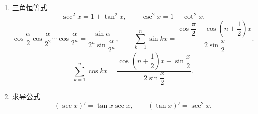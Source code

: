\begin{theorem}
\begin{enumerate}[label=\arabic*.]
\[                  \qquad
                  \cos\alpha=\dfrac{1-\tan^2\dfrac{\alpha}{2}}{1+\tan^2\dfrac{\alpha}{2}}.
              \]
        \item 三角恒等式
              \[
                  \sec^2x=1+\tan^2x,
                  \qquad
                  \csc^2x=1+\cot^2x.
              \]
              \[
                  \cos\dfrac{\alpha}{2}\cos\dfrac{\alpha}{2^2}\cdots
                  \cos\dfrac{\alpha}{2^n}
                  =\dfrac{\sin\alpha}{2^n\sin\dfrac{\alpha}{2^n}},
                  \qquad
                  \sum\limits_{k=1}^n\sin kx
                  =\dfrac{\cos\dfrac{\pi}{2}-\cos\left(n+\dfrac{1}{2}\right)x}
                  {2\sin\dfrac{x}{2}}.
              \]
              \[
                  \sum\limits_{k=1}^n\cos kx
                  =\dfrac{\cos\left(n+\dfrac{1}{2}\right)x-\sin\dfrac{x}{2}}
                  {2\sin\dfrac{x}{2}}.
              \]
        \item 求导公式
              \[
                  (\sec x)'=\tan x\sec x,
                  \qquad
                  (\tan x)'=\sec^2x.
              \]
    \end{enumerate}
\end{theorem}

